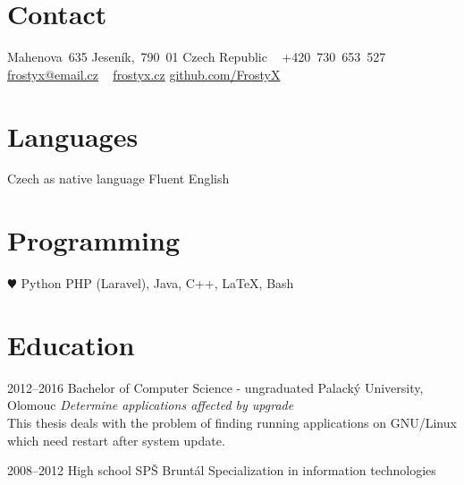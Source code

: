 \documentclass[]{friggeri-cv}
\begin{document}



\begin{aside} %
\section{Contact}
Mahenova~635
Jeseník,~790~01
Czech Republic
~
+420~730~653~527
\href{mailto:frostyx@email.cz}{frostyx@email.cz}
~
\href{http://frostyx.cz}{frostyx.cz}
\href{https://github.com/FrostyX}{github.com/FrostyX}
\section{Languages}
Czech as native language
Fluent English
\section{Programming}
{\color{red} $\varheartsuit$} Python
PHP (Laravel), Java,
C++, LaTeX, Bash
\end{aside}



\section{Education}

\begin{entrylist}

\entry
{2012--2016}
{Bachelor {\normalfont of Computer Science - ungraduated}}
{Palacký University, Olomouc}
{\emph{Determine applications affected by upgrade} \\ This thesis deals with the problem of finding running applications on GNU/Linux which need restart after system update.}

\entry
{2008--2012}
{{\normalfont High school}}
{SPŠ Bruntál}
{Specialization in information technologies}

\end{entrylist}


\end{document}
